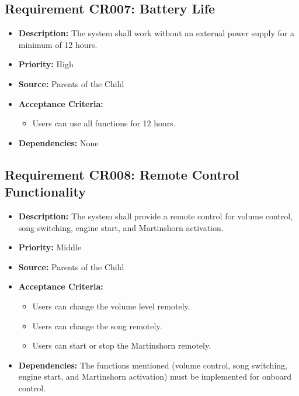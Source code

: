 \documentclass{article}
\begin{document}
	\subsection{Requirement CR007: Battery Life}
	\begin{itemize}
		\item \textbf{Description:} The system shall work without an external power supply for a minimum of 12 hours.
		\item \textbf{Priority:} High
		\item \textbf{Source:} Parents of the Child
		\item \textbf{Acceptance Criteria:}
		\begin{itemize}
			\item Users can use all functions for 12 hours.
		\end{itemize}
		\item \textbf{Dependencies:} None
	\end{itemize}
	
	\subsection{Requirement CR008: Remote Control Functionality}
	\begin{itemize}
		\item \textbf{Description:} The system shall provide a remote control for volume control, song switching, engine start, and Martinshorn activation.
		\item \textbf{Priority:} Middle
		\item \textbf{Source:} Parents of the Child
		\item \textbf{Acceptance Criteria:}
		\begin{itemize}
			\item Users can change the volume level remotely.
			\item Users can change the song remotely.
			\item Users can start or stop the Martinshorn remotely.
		\end{itemize}
		\item \textbf{Dependencies:} The functions mentioned (volume control, song switching, engine start, and Martinshorn activation) must be implemented for onboard control.
	\end{itemize}
	
\end{document}
